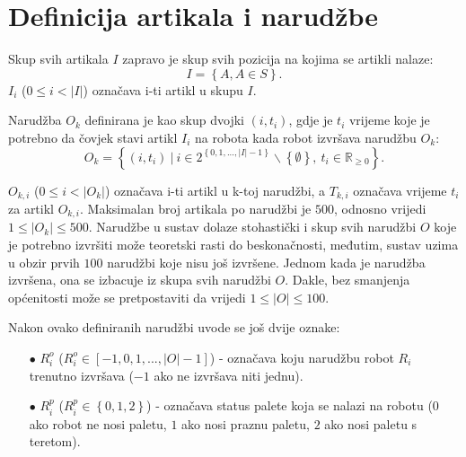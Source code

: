 \documentclass[times, utf8, seminar]{fer}
\begin{document}
\pagebreak

\section{Definicija artikala i narudžbe}
Skup svih artikala $I$ zapravo je skup svih pozicija na kojima se artikli nalaze:
\begin{equation}
I = \left\{A, A \in S\right\}.
\end{equation}
$I_i$ ($0 \le i < |I|$) označava i-ti artikl u skupu $I$.

Narudžba $O_k$ definirana
je kao skup dvojki $(i, t_{i})$, gdje je $t_{i}$ vrijeme koje je potrebno
da čovjek stavi artikl $I_i$ na robota kada robot izvršava narudžbu $O_k$:
\begin{equation}
O_k = \left\{ (i, t_{i})\ |\ i \in 2^{\left\{0, 1, ..., |I|-1\right\}}\backslash\left\{\emptyset\right\},\ t_{i} \in \mathbb{R}_{\ge0}\right\}.
\end{equation}

$O_{k, i}$ ($0 \le i < |O_k|$) označava i-ti artikl u k-toj narudžbi, a $T_{k, i}$ označava
vrijeme $t_i$ za artikl $O_{k, i}$. Maksimalan broj artikala po narudžbi
je $500$, odnosno vrijedi $1 \le |O_k| \le 500$. Narudžbe u sustav dolaze stohastički
i skup svih narudžbi $O$ koje je potrebno izvršiti može teoretski rasti do beskonačnosti,
međutim, sustav uzima u obzir prvih $100$ narudžbi koje nisu još izvršene. Jednom kada
je narudžba izvršena, ona se izbacuje iz skupa svih narudžbi $O$. Dakle, bez smanjenja općenitosti
može se pretpostaviti da vrijedi $1 \le |O| \le 100$.

Nakon ovako definiranih narudžbi uvode se još dvije oznake:
\begin{itemize}
    \item[$\bullet$] $R_{i}^{o}$ ($R_{i}^{o} \in [-1, 0, 1, ..., |O| - 1]$) - označava koju narudžbu
                     robot $R_i$ trenutno izvršava ($-1$ ako ne izvršava niti jednu).
    \item[$\bullet$] $R_{i}^{p}$ ($R_{i}^{p} \in \left\{0, 1, 2\right\}$) - označava status palete
                     koja se nalazi na robotu ($0$ ako robot ne nosi paletu, $1$ ako nosi praznu paletu, $2$ ako nosi paletu s teretom).
\end{itemize}
\end{document}
